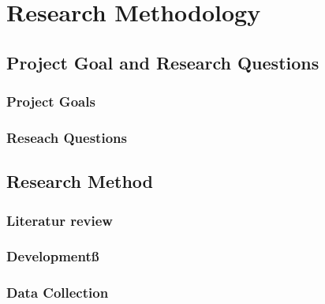 
\chapter{Research Methodology}

\section{Project Goal and Research Questions}
\subsection{Project Goals}
\subsection{Reseach Questions}
\section{Research Method}
\subsection{Literatur review}
\subsection{Developmentß}
\subsection{Data Collection}

\cleardoublepage




